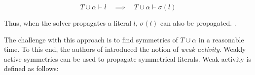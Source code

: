 	\begin{equation}
		T \cup \alpha \vdash l \quad
		\implies
		\quad T \cup \alpha \vdash \sigma(l)
	\end{equation}

	Thus, when the solver propagates a literal $l$, $\sigma(l)$ can also be propagated.
	.

	The challenge with this approach is to find symmetries of $T \cup \alpha$ in a
	reasonable time.
	To this end, the authors of \cite{devriendt2012symmetry} introduced the notion of
	\emph{weak activity}.
	Weakly active symmetries can be used to propagate symmetrical literals.
	Weak activity is defined as follows:\\

	\begin{definition}
		\todoi{\ldots}
	\end{definition}


